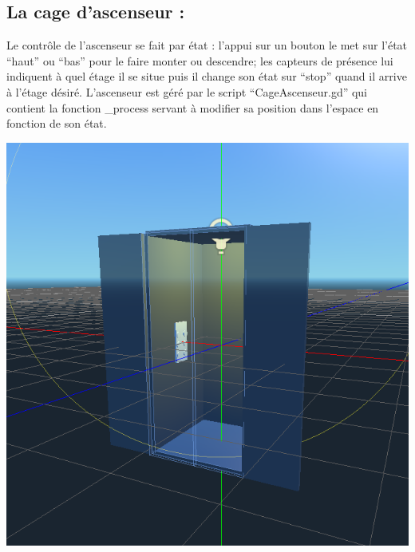 \documentclass[12pt]{article}
\begin{document}
\subsection{La cage d’ascenseur :}
\newline
Le contrôle de l’ascenseur se fait par état : l’appui sur un bouton le met sur l’état “haut” ou “bas” pour le faire monter ou descendre; les capteurs de présence lui indiquent à quel étage il se situe puis il change son état sur “stop” quand il arrive à l’étage désiré.
L’ascenseur est géré par le script “CageAscenseur.gd” qui contient la fonction \_process servant à modifier sa position dans l’espace en fonction de son état.
\newline
\begin{center}\includegraphics[scale=0.4]{asc.PNG}\end{center}
\newline
\newline
\end{document}
